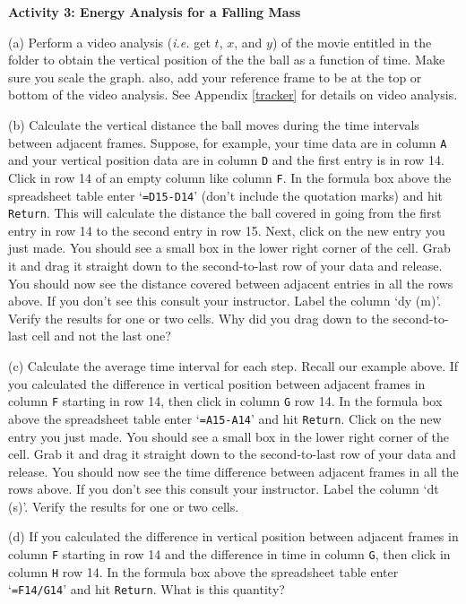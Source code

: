 \textbf{Activity 3: Energy Analysis for a Falling Mass}

(a) Perform a video analysis ({\it i.e.} get $t$, $x$, and $y$) of the movie entitled 
 in the \filename{\coursefolder} folder
to obtain the vertical position of the the ball as a function of time. 
Make sure you scale the graph. also, add your reference frame to be at the top or bottom of the video analysis.
See Appendix \ref{tracker} for details on video analysis.


(b) Calculate the vertical distance the ball moves during the time intervals between adjacent frames.
Suppose, for example, your time data are in column {\tt A} and your vertical position data are in 
column {\tt D} and the first entry is in row 14. 
Click in row 14 of an empty column like column {\tt F}.
In the formula box above the spreadsheet table enter `{\tt =D15-D14}' (don't include the quotation marks) 
and hit {\tt Return}.
This will calculate the distance the ball covered in going from the first entry in row 14 to the second entry 
in row 15.
Next, click on the new entry you just made. You should see a small box in the lower right corner of the cell.
Grab it and drag it straight down to the second-to-last row of your data and release.
You should now see the distance covered between adjacent entries in all the rows above. 
If you don't see this consult your instructor.
Label the column `dy (m)'.
Verify the results for one or two cells.
Why did you drag down to the second-to-last cell and not the last one?

\vspace{2.0cm}

(c) Calculate the average time interval for each step. Recall our example above.
If you calculated the difference in vertical position between adjacent frames in 
column {\tt F} starting in row 14, then
click in column {\tt G} row 14. 
In the formula box above the spreadsheet table enter `{\tt =A15-A14}' and hit {\tt Return}.
Click on the new entry you just made. You should see a small box in the lower right corner of the cell.
Grab it and drag it straight down to the second-to-last row of your data and release.
You should now see the time difference between adjacent frames in all the rows above. 
If you don't see this consult your instructor.
Label the column `dt (s)'.
Verify the results for one or two cells.

(d)  If you calculated the difference in vertical position between adjacent frames in 
column {\tt F} starting in row 14 and the difference in time in column {\tt G}, then
click in column {\tt H} row 14.
In the formula box above the spreadsheet table enter `{\tt =F14/G14}' and hit {\tt Return}.
What is this quantity?

